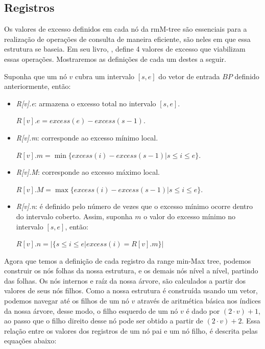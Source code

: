 \subsection{Registros}
Os valores de excesso definidos em cada nó da rmM-tree são essenciais para a realização de operações de consulta de maneira eficiente, são neles em que essa estrutura se baseia.  Em seu livro, \citet{book-compact-data-structures}, define 4 valores de excesso que viabilizam essas operações. Mostraremos as definições de cada um destes a seguir. 

Suponha que um nó $v$ cubra um intervalo $[s,e]$ do vetor de entrada $BP$ definido anteriormente, então:
\begin{itemize}
    \item \textit{R[v].e}: armazena o excesso total no intervalo $[s,e]$.
    
    $R[v].e = excess(e) - excess(s-1)$.
    \item \textit{R[v].m}: corresponde ao excesso mínimo local.
    
    $R[v].m = \min\{excess(i) - excess(s - 1) | s \leq i \leq e\}$.
    \item \textit{R[v].M}: corresponde ao excesso máximo local.
    
    $R[v].M = \max\{excess(i) - excess(s - 1) | s \leq i \leq e\}$.
    
    \item \textit{R[v].n}: é definido pelo número de vezes que o excesso mínimo ocorre dentro do intervalo coberto. Assim, suponha $m$ o valor do excesso mínimo no intervalo $[s,e]$, então:

    $R[v].n = |\{s \leq i \leq e | excess(i) = R[v].m\}|$
\end{itemize}

    Agora que temos a definição de cada registro da range min-Max tree, podemos construir os nós folhas da nossa estrutura, e os demais nós nível a nível, partindo das folhas. Os nós internos e raíz da nossa árvore, são calculados a partir dos valores de seus nós filhos. Como a nossa estrutura é construída usando um vetor, podemos navegar até os filhos de um nó $v$ através de aritmética básica nos índices da nossa árvore, desse modo, o filho esquerdo de um nó $v$ é dado por $(2 \cdot v)+1$, ao passo que o filho direito desse nó pode ser obtido a partir de $(2 \cdot v) +2$. Essa relação entre os valores dos registros de um nó pai e um nó filho, é descrita pelas equações abaixo:

